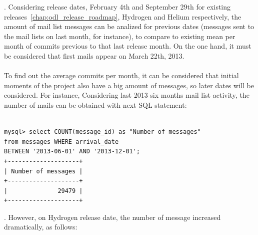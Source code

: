 \documentclass[a4paper, 12pt]{book}
\begin{document}
. Considering release dates, February 4th and September 29th for existing releases~\ref{chap:odl_release_roadmap}, Hydrogen and Helium respectively, the amount of mail list messages can be analized for previous dates (messages sent to the mail lists on last month, for instance), to compare to existing mean per month of commits previous to that last release month. On the one hand, it must be considered that first mails appear on March 22th, 2013.\\
\\
To find out the average commits per month, it can be considered that initial moments of the project also have a big amount of messages, so later dates will be considered. For instance, Considering last 2013 six months mail list activity, the number of mails can be obtained with next SQL statement:

\begin{verbatim}

mysql> select COUNT(message_id) as "Number of messages"
from messages WHERE arrival_date
BETWEEN '2013-06-01' AND '2013-12-01';
+--------------------+
| Number of messages |
+--------------------+
|              29479 |
+--------------------+

\end{verbatim}
. However, on Hydrogen release date, the number of message increased dramatically, as follows:
\end{document}
